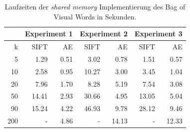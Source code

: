\begin{table}
    \centering
    \begin{tabular}[t]{|r|r|r|r|r|r|r|}
    \hline
         & \multicolumn{2}{|c|}{Experiment 1} & \multicolumn{2}{|c|}{Experiment 2} & \multicolumn{2}{|c|}{Experiment 3} \\ \hline
	k    & SIFT  & AE   & SIFT   & AE    & SIFT  & AE    \\ \hline    
    5    &  1.29 & 0.51 &   3.02 &  0.78 &  1.51 &  0.57 \\ \hline
    10   &  2.58 & 0.95 &  10.27 &  3.00 &  3.45 &  1.04 \\ \hline
    20   &  7.96 & 1.70 &   8.28 &  5.19 &  7.54 &  3.08 \\ \hline
    50   & 14.41 & 2.93 &  30.66 &  4.95 & 13.05 &  5.04 \\ \hline
    90   & 15.24 & 4.22 &  46.93 &  9.78 & 28.12 &  9.46 \\ \hline
	200  & 	   - & 4.86 &      - & 14.13 & -     & 12.33 \\ \hline
	\end{tabular}
	\caption{Laufzeiten der \textit{shared memory} Implementierung des Bag of Visual Words in Sekunden.}
\end{table}